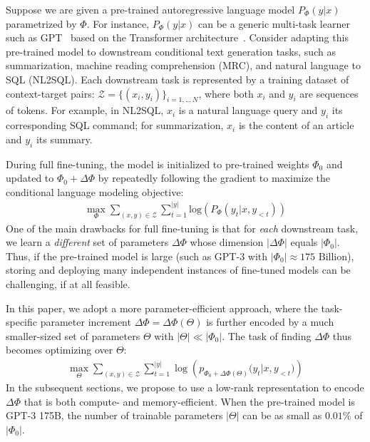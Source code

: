 \documentclass{article} %
\begin{document}
\newcommand{\cZ}{\mathcal{Z}}
Suppose we are given a pre-trained autoregressive language model $P_\Phi(y|x)$ parametrized by $\Phi$.
For instance, $P_\Phi(y|x)$ can be a generic multi-task learner such as GPT~\citep{radford_language_nodate,brown_language_2020} based on the Transformer architecture~\citep{vaswani2017attention}.
Consider adapting this pre-trained model to downstream conditional text generation tasks, such as summarization, machine reading comprehension (MRC), and natural language to SQL (NL2SQL).
Each downstream task is represented by a training dataset of context-target pairs: $\cZ = \{(x_i, y_i)\}_{i=1,..,N}$, where both $x_i$ and $y_i$ are sequences of tokens.
For example, in NL2SQL, $x_i$ is a natural language query and $y_i$ its corresponding SQL command; for summarization, $x_i$ is the content of an article and $y_i$ its summary.

During full fine-tuning, the model is initialized to pre-trained weights $\Phi_0$ and updated to $\Phi_0+\Delta \Phi$ by repeatedly following the gradient to maximize the conditional language modeling objective:
\begin{align}
    \max_{\Phi} \sum_{(x,y)\in\cZ} \sum_{t=1}^{|y|}  \text{log} \left(  P_{\Phi}(y_{t} | x, y_{<t}) \right)
\label{eq:ft_obj}
\end{align}
One of the main drawbacks for full fine-tuning is that for \emph{each} downstream task, we learn a \emph{different} set of parameters $\Delta\Phi$ whose dimension $|\Delta\Phi|$ equals $|\Phi_0|$.
Thus, if the pre-trained model is large (such as GPT-3 with $|\Phi_0|\approx175 \text{~Billion}$), storing and deploying many independent instances of fine-tuned models can be challenging, if at all feasible.

In this paper, we adopt a more parameter-efficient approach, where the task-specific parameter increment $\Delta\Phi = \Delta\Phi(\Theta)$ is further encoded by a much smaller-sized set of parameters $\Theta$ with $|\Theta| \ll |\Phi_0|$.
The task of finding $\Delta\Phi$ thus becomes optimizing over $\Theta$:
\begin{align}
    \max_{\Theta} \sum_{(x,y)\in\cZ}  \sum_{t=1}^{|y|}  \log\left({p_{\Phi_0+\Delta\Phi(\Theta)}(y_{t} | x, y_{<t}})\right)
\label{eq:ft_add}
\end{align}
In the subsequent sections, we propose to use a low-rank representation to encode $\Delta\Phi$ that is both compute- and memory-efficient.
When the pre-trained model is GPT-3 175B, the number of trainable parameters $|\Theta|$ can be as small as $0.01\%$ of $|\Phi_0|$. %
\end{document}
